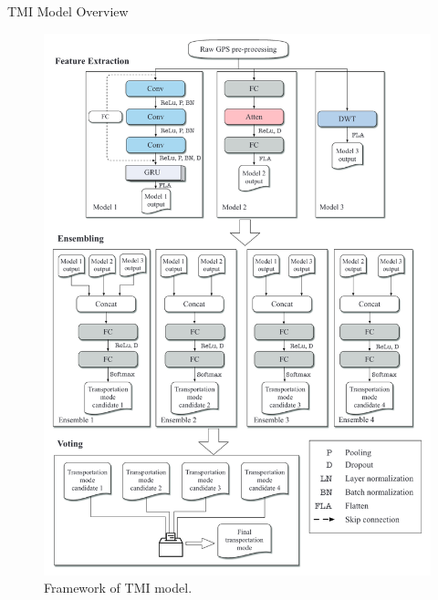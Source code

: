 \documentclass[UTF8]{beamer}
\begin{document}
\begin{frame}
{TMI Model}
{Overview}
\begin{figure}[ht]
\centering
\includegraphics[height=0.56\textwidth]{images/tmi}
\caption{Framework of TMI model.} 
\end{figure}
\end{frame}
\end{document}
